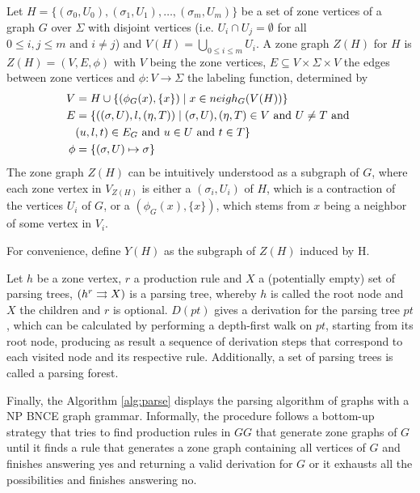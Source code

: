 \documentclass[]{report}
\begin{document}
\begin{definition}
	Let $H = \{(\sigma_0,U_0),(\sigma_1,U_1),\dots,(\sigma_m,U_m)\}$ be a set of zone vertices of a graph $G$ over $\Sigma$ with disjoint vertices (i.e. $U_i \cap U_j = \emptyset$ for all $0 \leq i,j \leq m \text{ and } i \neq j$) and $V(H) = \bigcup_{0 \leq i \leq m}{U_i}$. A zone graph $Z(H)$ for $H$ is $Z(H) = (V, E, \phi)$ with $V$ being the zone vertices, $E \subseteq V \times \Sigma \times V$ the edges between zone vertices and $\phi: V \to \Sigma$ the labeling function, determined by
	\begin{align*}
		V & = H \cup \{(\phi_G(x),\{x\}) \; | \; x \in neigh_G(V(H)) \}\\
		E & = \{((\sigma,U),l,(\eta,T)) \; | \; (\sigma,U),(\eta,T) \in V \text{ and } U \neq T \text{ and } \\
		& (u,l,t) \in E_G \text{ and } u \in U \text{ and } t \in T\} \\
		\phi & = \{(\sigma,U) \mapsto \sigma\}
	\end{align*}
	The zone graph $Z(H)$ can be intuitively understood as a subgraph of $G$, where each zone vertex in $V_{Z(H)}$ is either a $(\sigma_i,U_i)$ of $H$, which is a contraction of the vertices $U_i$ of $G$, or a $(\phi_G(x),\{x\})$, which stems from $x$ being a neighbor of some vertex in $V_i$.
	
	For convenience, define $Y(H)$ as the subgraph of $Z(H)$ induced by H.
\end{definition}

\begin{definition}
	Let $h$ be a zone vertex, $r$ a production rule and $X$ a (potentially empty) set of parsing trees, $\ptree{h}{r}{X}$ is a parsing tree, whereby $h$ is called the root node and $X$ the children and $r$ is optional. $D(pt)$ gives a derivation for the parsing tree $pt$, which can be calculated by performing a depth-first walk on $pt$, starting from its root node, producing as result a sequence of derivation steps that correspond to each visited node and its respective rule. Additionally, a set of parsing trees is called a parsing forest.
\end{definition}

Finally, the Algorithm \ref{alg:parse} displays the parsing algorithm of graphs with a NP BNCE graph grammar. Informally, the procedure follows a bottom-up strategy that tries to find production rules in $GG$ that generate zone graphs of $G$ until it finds a rule that generates a zone graph containing all vertices of $G$ and finishes answering yes and returning a valid derivation for $G$ or it exhausts all the possibilities and finishes answering no.
\end{document}
